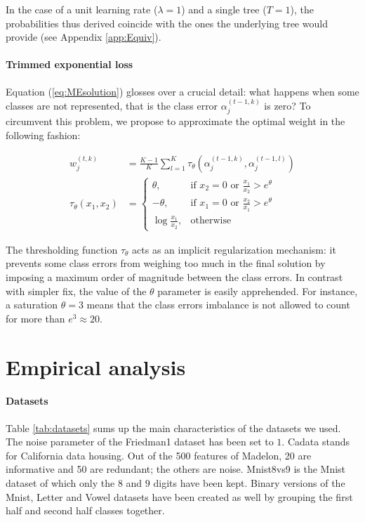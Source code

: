 \documentclass{article}
\begin{document}
In the case of a unit learning rate ($\lambda = 1$) and a single tree ($T=1$), 
the probabilities thus derived coincide with the ones the underlying tree would 
provide (see Appendix \ref{app:Equiv}).


\paragraph{Trimmed exponential loss}
Equation (\ref{eq:MEsolution}) glosses over a crucial detail: what happens when 
some classes are not represented, that is the class error $\alpha_j^{(t-1, k)}$ 
is zero? To circumvent this problem, we propose to approximate the optimal 
weight in the following fashion:

\vspace*{-\baselineskip}
\begin{align}\label{eq:METrimmed}
w_j^{(t,k)} &= \frac{K-1}{K} \sum_{l=1}^{K} \tau_{\theta} \left(\alpha_j^{(t-1, 
k)},  \alpha_j^{(t-1, l)}\right)\\
\tau_{\theta}(x_1, x_2) &=\begin{cases}
    \theta, & \text{if $x_2 = 0$ or $\frac{x_1}{x_2} > e^{\theta}$}\\
    -\theta,& \text{if $x_1 = 0$ or $\frac{x_2}{x_1} > e^{\theta}$}\\
    \log \frac{x_1}{x_2}, & \text{otherwise}
  \end{cases}
\end{align}
\vspace*{-\baselineskip}

The thresholding function $\tau_{\theta}$ acts as an implicit regularization 
mechanism: it prevents some class errors from weighing too much in the final 
solution by imposing a maximum order of magnitude between the class errors. In 
contrast with simpler fix, the value of the  $\theta$ parameter is easily 
apprehended.%
For instance, a saturation $\theta=3$ means that the class errors imbalance is 
not allowed to count for more than $e^3 \approx 20$. 




\section{Empirical analysis}
\label{sec:analysis}

\paragraph{Datasets}
Table \ref{tab:datasets} sums up the main characteristics of the datasets we 
used. The noise parameter of the Friedman1 dataset has been set to $1$. Cadata 
stands for California data housing. Out of the 500 features of Madelon, 20 are 
informative and 50 are redundant; the others are noise. Mnist8vs9 is the Mnist 
dataset of which only the $8$ and $9$ digits have been kept. Binary versions 
of the Mnist, Letter and Vowel datasets have been created as well by grouping 
the first half and second half classes together.
\end{document}

